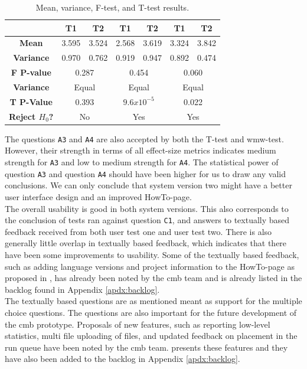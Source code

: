 \begin{table}[t!]
\begin{tabular}{|c||c|c||c|c||c|c||}
      &  T1 & T2 & T1 & T2 & T1 & T2 \\ \hline
      \textbf{Mean} & 3.595 & 3.524 & 2.568 & 3.619 & 3.324 & 3.842 \\ \hline
      \textbf{Variance} & 0.970 & 0.762 & 0.919 & 0.947 & 0.892 & 0.474 \\ \hline
      \textbf{F P-value} & \multicolumn{2}{c||}{0.287} & \multicolumn{2}{c||}{0.454} & \multicolumn{2}{c||}{0.060}\\ \hline
      \textbf{Variance} & \multicolumn{2}{c||}{Equal} & \multicolumn{2}{c||}{Equal} & \multicolumn{2}{c||}{Equal} \\ \hline
      \textbf{T P-Value} & \multicolumn{2}{c||}{0.393} & \multicolumn{2}{c||}{$9.6x10^{-5}$} & \multicolumn{2}{c||}{0.022} \\ \hline
      \textbf{Reject $H_0$?} & \multicolumn{2}{c||}{No} & \multicolumn{2}{c||}{Yes} & \multicolumn{2}{c||}{Yes} \\ \hline
    \end{tabular}
    \caption{Mean, variance, F-test, and T-test results.}
    \label{tab:results-tests-all}
\end{table}

The questions \texttt{A3} and \texttt{A4} are also accepted by both the T-test and \gls{wmw}-test. However, their strength in terms of all effect-size metrics indicates medium strength for \texttt{A3} and low to medium strength for \texttt{A4}. The statistical power of question \texttt{A3} and question \texttt{A4} should have been higher for us to draw any valid conclusions. We can only conclude that system version two might have a better user interface design and an improved HowTo-page. \\

The overall usability is good in both system versions. This also corresponds to the conclusion of tests ran against question  \texttt{C1}, and answers to textually based feedback received from both user test one and user test two. There is also generally little overlap in textually based feedback, which indicates that there have been some improvements to usability. Some of the textually based feedback, such as adding language versions and project information to the HowTo-page as proposed in , has already been noted by the \gls{cmb} team and is already listed in the backlog found in Appendix \ref{apdx:backlog}. \\

The textually based questions are as mentioned meant as support for the multiple choice questions. The questions are also important for the future development of the \gls{cmb} prototype. Proposals of new features, such as reporting low-level statistics, multi file uploading of files, and updated feedback on placement in the run queue have been noted by the \gls{cmb} team.  presents these features and they have also been added to the backlog in Appendix \ref{apdx:backlog}. \\

